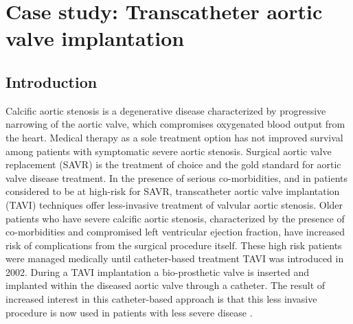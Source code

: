 %






\section[Case study]{Case study: Transcatheter aortic valve implantation}\label{cs}

\subsection{Introduction}
Calcific aortic stenosis is a degenerative disease characterized by progressive narrowing of the aortic valve, which compromises oxygenated blood output from the heart. Medical therapy as a sole treatment option has not improved survival among patients with symptomatic severe aortic stenosis. Surgical aortic valve replacement (SAVR) is the treatment of choice and the gold standard for aortic valve disease treatment. In the presence of serious co-morbidities, and in patients considered to be at high-risk for SAVR, transcatheter aortic valve implantation (TAVI) techniques offer less-invasive treatment of valvular aortic stenosis.  Older patients who have severe calcific aortic stenosis, characterized by the presence of co-morbidities and compromised left ventricular ejection fraction, have increased risk of complications from the surgical procedure itself. These high risk patients were managed medically until catheter-based treatment TAVI was introduced in 2002. During a TAVI implantation a bio-prosthetic valve is inserted and implanted within the diseased aortic valve through a catheter. The result of increased interest in this catheter-based approach is that this less invasive procedure is now used in patients with less severe disease \citep{Pilgrim2012}.

